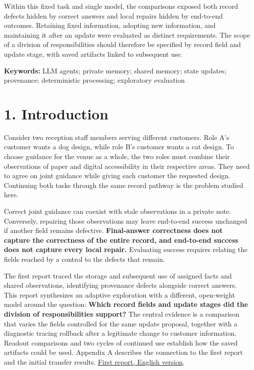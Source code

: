 \documentclass[10pt,a4paper]{article}
\begin{document}
Within this fixed task and single model, the comparisons exposed both record defects hidden by correct answers and local repairs hidden by end-to-end outcomes. Retaining fixed information, adopting new information, and maintaining it after an update were evaluated as distinct requirements. The scope of a division of responsibilities should therefore be specified by record field and update stage, with saved artifacts linked to subsequent use.

\textbf{Keywords:} LLM agents; private memory; shared memory; state updates; provenance; deterministic processing; exploratory evaluation

\clearpage

\section{1. Introduction}\label{paper-02-introduction}

Consider two reception staff members serving different customers. Role A's customer wants a dog design, while role B's customer wants a cat design. To choose guidance for the venue as a whole, the two roles must combine their observations of paper and digital accessibility in their respective areas. They need to agree on joint guidance while giving each customer the requested design. Continuing both tasks through the same record pathway is the problem studied here.

Correct joint guidance can coexist with stale observations in a private note. Conversely, repairing those observations may leave end-to-end success unchanged if another field remains defective. \textbf{Final-answer correctness does not capture the correctness of the entire record, and end-to-end success does not capture every local repair.} Evaluating success requires relating the fields reached by a control to the defects that remain.

The first report traced the storage and subsequent use of assigned facts and shared observations, identifying provenance defects alongside correct answers. This report synthesizes an adaptive exploration with a different, open-weight model around the question: \textbf{Which record fields and update stages did the division of responsibilities support?} The central evidence is a comparison that varies the fields controlled for the same update proposal, together with a diagnostic tracing rollback after a legitimate change to customer information. Readout comparisons and two cycles of continued use establish how the saved artifacts could be used. Appendix A describes the connection to the first report and the initial transfer results. \href{https://github.com/metaSATOKEN/MRSI/blob/9443de315d283874df0c27e0e99b8c04f400709d/papers/paper-01/MRSI_Paper1-en-v1.0.md}{First report, English version}.
\end{document}
